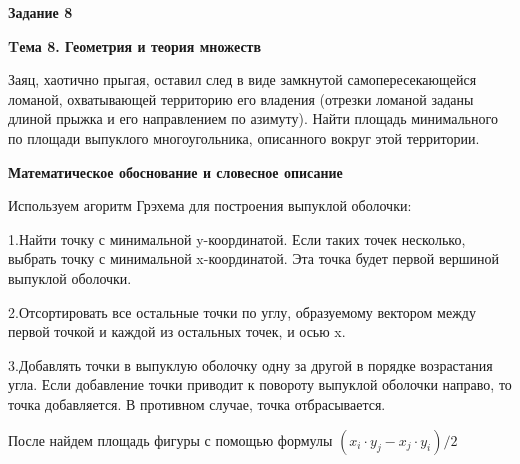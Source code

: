 \documentclass[12pt, a4paper]{article}
\begin{document}
		\begin{flushleft}
			
			{\textbf{Задание 8}}\par
			{\textbf{Tема 8. Геометрия и теория множеств}}\par
			{Заяц, хаотично прыгая, оставил след в виде замкнутой самопересекающейся
			ломаной, охватывающей территорию его владения (отрезки
			ломаной заданы длиной прыжка и его направлением по азимуту).
			Найти площадь минимального по площади выпуклого многоугольника,
			описанного вокруг этой территории.}\par
			{\textbf{Математическое обоснование и словесное описание}\par
			Используем агоритм Грэхема для построения выпуклой оболочки:\par
			1.Найти точку с минимальной y-координатой.
			Если таких точек несколько, выбрать точку с минимальной x-координатой. 
			Эта точка будет первой вершиной выпуклой оболочки.\par
			2.Отсортировать все остальные точки по углу, образуемому вектором
			между первой точкой и каждой из остальных точек, и осью x.\par
			3.Добавлять точки в выпуклую оболочку одну за другой в порядке возрастания угла.
			Если добавление точки приводит к повороту выпуклой оболочки направо, то точка добавляется. 
			В противном случае, точка отбрасывается.\par
			После найдем площадь фигуры с помощью формулы $(x_i\cdot y_j-x_j\cdot y_i)/2$
			}\par

		\end{flushleft}
\end{document}

